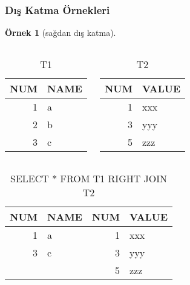\documentclass[dvipsnames]{beamer}
\theoremstyle{definition}
\theoremstyle{example}
\newtheorem{ornek}[theorem]{Örnek}
\theoremstyle{plain}
\begin{document}
\begin{frame}[fragile]
  \frametitle{Dış Katma Örnekleri}

  \begin{ornek}[sağdan dış katma]
    \begin{columns}[t]
      \begin{tiny}
      \begin{table}
        \caption{T1}
        \begin{tabular}{|r|l|}\hline
NUM & NAME\\\hline\hline
  1 & a   \\\hline
  2 & b   \\\hline
  3 & c   \\\hline
        \end{tabular}
      \end{table}
      \end{tiny}

      \begin{tiny}
      \begin{table}
        \caption{T2}
        \begin{tabular}{|r|l|}\hline
NUM & VALUE\\\hline\hline
  1 & xxx  \\\hline
  3 & yyy  \\\hline
  5 & zzz  \\\hline
        \end{tabular}
      \end{table}
      \end{tiny}
    \end{columns}

    \pause
    \begin{center}
      \begin{tiny}
      \begin{table}
        \caption{SELECT * FROM T1 RIGHT JOIN T2}
        \begin{tabular}{|r|l|r|l|}\hline
NUM & NAME & NUM & VALUE\\\hline\hline
  1 & a    &   1 & xxx  \\\hline
  3 & c    &   3 & yyy  \\\hline
    &      &   5 & zzz  \\\hline
        \end{tabular}
      \end{table}
      \end{tiny}
    \end{center}
  \end{ornek}
\end{frame}
\end{document}
